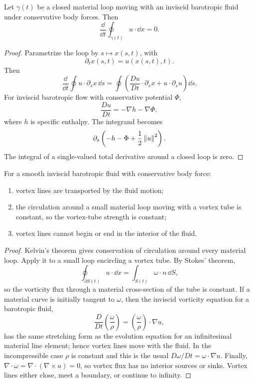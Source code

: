 \begin{proposition}
Let \(\gamma(t)\) be a closed material loop moving with an inviscid barotropic
fluid under conservative body forces. Then
\[
  \frac{\dd}{\dd t}\oint_{\gamma(t)}u\cdot \dd x=0.
\]
\end{proposition}

\begin{proof}
Parametrize the loop by \(s\mapsto x(s,t)\), with
\[
  \partial_t x(s,t)=u(x(s,t),t).
\]
Then
\[
  \frac{\dd}{\dd t}\oint u\cdot \partial_sx\,\dd s
  =
  \oint
  \left(
    \frac{D u}{D t}\cdot \partial_sx
    +
    u\cdot\partial_su
  \right)\dd s.
\]
For inviscid barotropic flow with conservative potential \(\Phi\),
\[
  \frac{D u}{D t}=-\nabla h-\nabla\Phi,
\]
where \(h\) is specific enthalpy. The integrand becomes
\[
  \partial_s\left(
    -h-\Phi+\frac12\left\lVert u\right\rVert^2
  \right).
\]
The integral of a single-valued total derivative around a closed loop is zero.
\end{proof}

\begin{proposition}
For a smooth inviscid barotropic fluid with conservative body force:
\begin{enumerate}
\item vortex lines are transported by the fluid motion;
\item the circulation around a small material loop moving with a vortex tube is
constant, so the vortex-tube strength is constant;
\item vortex lines cannot begin or end in the interior of the fluid.
\end{enumerate}
\end{proposition}

\begin{proof}
Kelvin's theorem gives conservation of circulation around every material loop.
Apply it to a small loop encircling a vortex tube. By Stokes' theorem,
\[
  \oint_{\partial S(t)}u\cdot\dd x
  =
  \int_{S(t)}\omega\cdot n\,\dd S,
\]
so the vorticity flux through a material cross-section of the tube is constant.
If a material curve is initially tangent to \(\omega\), then the inviscid
vorticity equation for a barotropic fluid,
\[
  \frac{D}{Dt}\left(\frac{\omega}{\rho}\right)
  =
  \left(\frac{\omega}{\rho}\right)\cdot\nabla u,
\]
has the same stretching form as the evolution equation for an infinitesimal
material line element; hence vortex lines move with the fluid. In the
incompressible case \(\rho\) is constant and this is the usual
\(D\omega/Dt=\omega\cdot\nabla u\).
Finally, \(\nabla\cdot\omega=\nabla\cdot(\nabla\times u)=0\), so vortex flux has
no interior sources or sinks. Vortex lines either close, meet a boundary, or
continue to infinity.
\end{proof}

